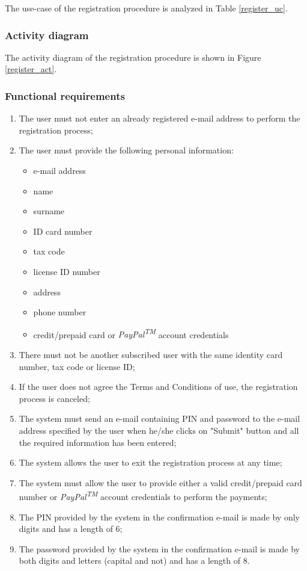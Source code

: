 The use-case of the registration procedure is analyzed in Table \ref{register_uc}.

\subsubsection{Activity diagram}

The activity diagram of the registration procedure is shown in Figure \ref{register_act}.

\subsubsection{Functional requirements}
\begin{enumerate}
\item The user must not enter an already registered e-mail address to perform the registration process;
\item The user must provide the following personal information:
	\begin{itemize}
	\item e-mail address
	\item name
	\item surname
	\item ID card number
	\item tax code
	\item license ID number
	\item address
	\item phone number
	\item credit/prepaid card or \emph{PayPal\textsuperscript{TM}} account credentials
	\end{itemize}
\item There must not be another subscribed user with the same identity card number, tax code or license ID;
\item If the user does not agree the Terms and Conditions of use, the registration process is canceled;
\item The system must send an e-mail containing PIN and password to the e-mail address specified by the user when he/she clicks on "Submit" button and all the required information has been entered;
\item The system allows the user to exit the registration process at any time;
\item The system must allow the user to provide either a valid credit/prepaid card number or \emph{PayPal\textsuperscript{TM}} account credentials to perform the payments;
\item The PIN provided by the system in the confirmation e-mail is made by only digits and has a length of 6;
\item The password provided by the system in the confirmation e-mail is made by both digits and letters (capital and not) and has a length of 8.
\end{enumerate}

